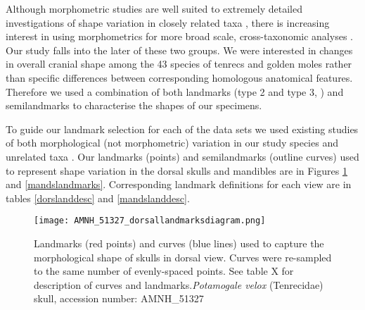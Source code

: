 \documentclass[12pt,a4paper]{article}
\begin{document}
Although morphometric studies are well suited to extremely detailed investigations of shape variation in closely related taxa \citep[e.g.][]{Cardini2003, Panchetti2008, Blagojevic2011}, there is increasing interest in using morphometrics for more broad scale, cross-taxonomic analyses \citep{Wroe2007, Klingenberg2013}. Our study falls into the later of these two groups. We were interested in changes in overall cranial shape among the 43 species of tenrecs and golden moles rather than specific differences between corresponding homologous anatomical features. Therefore we used a combination of both landmarks (type 2 and type 3, \citep{Zelditch2012}) and semilandmarks to characterise the shapes of our specimens. %

To guide our landmark selection for each of the data sets we used existing studies of both morphological (not morphometric) variation in our study species \citep{Asher1999, Asher2008, Asher2010} and unrelated taxa \citep[e.g.][]{Barrow2008, Panchetti2008, Macholan2008, Klenovsek2013}. %
Our landmarks (points) and semilandmarks (outline curves) used to represent shape variation in the dorsal skulls and mandibles are in Figures \ref{dorslandmarks} and \ref{mandslandmarks}. Corresponding landmark definitions for each view are in tables \ref{dorslanddesc} and \ref{mandslanddesc}.



\begin{figure}[H]
\centering
\texttt{[image: AMNH\_51327\_dorsallandmarksdiagram.png]}
\caption{Landmarks (red points) and curves (blue lines) used to capture the morphological shape of skulls in dorsal view. Curves were re-sampled to the same number of evenly-spaced points. See table X for description of curves and landmarks.\textit{Potamogale velox} (Tenrecidae) skull, accession number: AMNH\_51327}
\label{dorslandmarks}
\end{figure}
\end{document}
